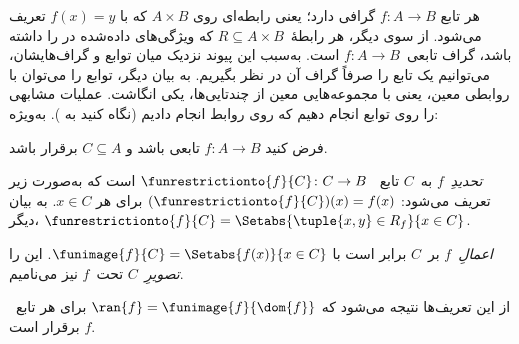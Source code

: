 \documentclass[../../../include/open-logic-section]{subfiles}
\begin{document}
\begin{explain}
هر تابع $f\colon A \to B$ گرافی دارد؛ یعنی رابطه‌ای روی $A
\times B$ که با $f(x) = y$ تعریف می‌شود. از سوی دیگر، هر رابطهٔ~$R
\subseteq A \times B$ که ویژگی‌های داده‌شده در
 را داشته باشد، گراف تابعی~$f \colon A \to
B$ است. به‌سبب این پیوند نزدیک میان توابع و
گراف‌هایشان، می‌توانیم یک تابع را صرفاً گراف آن در نظر بگیریم. به
بیان دیگر، توابع را می‌توان با روابطی معین، یعنی با
مجموعه‌هایی معین از چندتایی‌ها، یکی انگاشت.  عملیات مشابهی را روی
توابع انجام دهیم که روی روابط انجام دادیم (نگاه کنید به
). به‌ویژه:
\end{explain}

\begin{defn}
فرض کنید $f \colon A \to B$ تابعی باشد و $C\subseteq A$ برقرار باشد.

\emph{تحدیدِ}~$f$ به~$C$ تابع
~$\funrestrictionto{f}{C}\colon C \to B$ است که به‌صورت زیر تعریف می‌شود:
$(\funrestrictionto{f}{C})(x) = f(x)$ برای هر $x \in C$. به
بیان دیگر، $\funrestrictionto{f}{C} = \Setabs{\tuple{x, y} \in R_f}{x \in
C}$.

\emph{اعمالِ}~$f$ بر~$C$ برابر است با $\funimage{f}{C} =
\Setabs{f(x)}{x \in C}$. این را \emph{تصویرِ}~$C$
تحت~$f$ نیز می‌نامیم.
\end{defn}

\begin{explain}
از این تعریف‌ها نتیجه می‌شود که $\ran{f} =
\funimage{f}{\dom{f}}$ برای هر تابع~$f$ برقرار است.
\end{explain}
\end{document}
